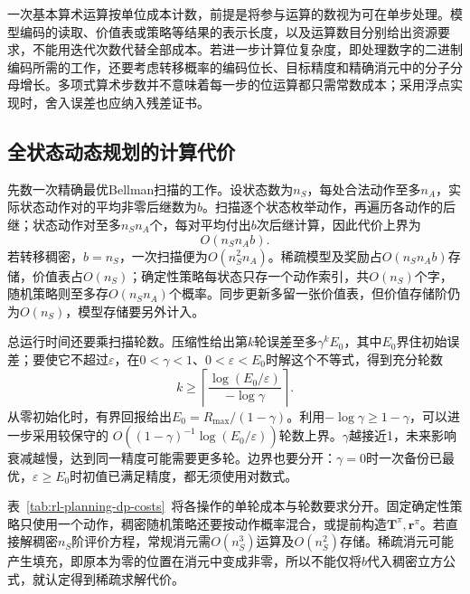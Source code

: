 一次基本算术运算按单位成本计数，前提是将参与运算的数视为可在单步处理。模型编码的读取、价值表或策略等结果的表示长度，以及运算数目分别给出资源要求，不能用迭代次数代替全部成本。若进一步计算位复杂度，即处理数字的二进制编码所需的工作，还要考虑转移概率的编码位长、目标精度和精确消元中的分子分母增长。多项式算术步数并不意味着每一步的位运算都只需常数成本；采用浮点实现时，舍入误差也应纳入残差证书。

\subsection{全状态动态规划的计算代价}
\label{sec:rl-planning-dp-complexity}

先数一次精确最优Bellman扫描的工作。设状态数为$n_S$，每处合法动作至多$n_A$，实际状态动作对的平均非零后继数为$b$。扫描逐个状态枚举动作，再遍历各动作的后继；状态动作对至多$n_Sn_A$个，每对平均付出$b$次后继计算，因此代价上界为
\begin{equation}
 O(n_Sn_Ab).
 \label{eq:rl-planning-sweep-cost}
\end{equation}
若转移稠密，$b=n_S$，一次扫描便为$O(n_S^2n_A)$。稀疏模型及奖励占$O(n_Sn_Ab)$存储，价值表占$O(n_S)$；确定性策略每状态只存一个动作索引，共$O(n_S)$个字，随机策略则至多存$O(n_Sn_A)$个概率。同步更新多留一张价值表，但价值存储阶仍为$O(n_S)$，模型存储要另外计入。

总运行时间还要乘扫描轮数。压缩性给出第$k$轮误差至多$\gamma^kE_0$，其中$E_0$界住初始误差；要使它不超过$\varepsilon$，在$0<\gamma<1$、$0<\varepsilon<E_0$时解这个不等式，得到充分轮数
\begin{equation}
 k\geq\left\lceil\frac{\log(E_0/\varepsilon)}{-\log\gamma}\right\rceil.
 \label{eq:rl-planning-iteration-count}
\end{equation}
从零初始化时，有界回报给出$E_0=R_{\max}/(1-\gamma)$。利用$-\log\gamma\geq1-\gamma$，可以进一步采用较保守的
$O((1-\gamma)^{-1}\log(E_0/\varepsilon))$轮数上界。$\gamma$越接近1，未来影响衰减越慢，达到同一精度可能需要更多轮。边界也要分开：$\gamma=0$时一次备份已最优，$\varepsilon\geq E_0$时初值已满足精度，都无须使用对数式。

表~\ref{tab:rl-planning-dp-costs}~将各操作的单轮成本与轮数要求分开。固定确定性策略只使用一个动作，稠密随机策略还要按动作概率混合，或提前构造$\bm T^\pi,\bm r^\pi$。若直接解稠密$n_S$阶评价方程，常规消元需$O(n_S^3)$运算及$O(n_S^2)$存储。稀疏消元可能产生填充，即原本为零的位置在消元中变成非零，所以不能仅将$b$代入稠密立方公式，就认定得到稀疏求解代价。

